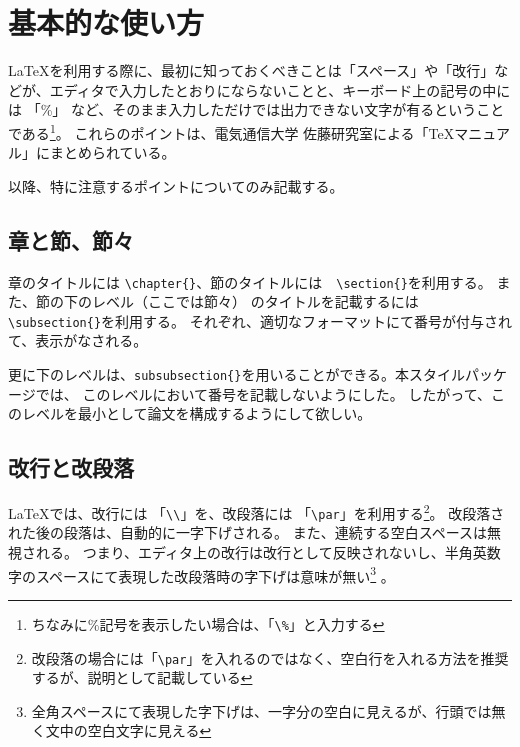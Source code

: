 \section{基本的な使い方}
\LaTeX を利用する際に、最初に知っておくべきことは「スペース」や「改行」などが、エディタで入力したとおりにならないことと、キーボード上の記号の中には 「\%」 など、そのまま入力しただけでは出力できない文字が有るということである\footnote{ちなみに\%記号を表示したい場合は、「\verb+\%+」と入力する}。
これらのポイントは、電気通信大学 佐藤研究室による「TeXマニュアル」\cite{HTUlatex}にまとめられている。

以降、特に注意するポイントについてのみ記載する。
\subsection{章と節、節々}
章のタイトルには \verb+\chapter{}+、節のタイトルには　\verb+\section{}+を利用する。
また、節の下のレベル（ここでは節々） のタイトルを記載するには \verb+\subsection{}+を利用する。
それぞれ、適切なフォーマットにて番号が付与されて、表示がなされる。

更に下のレベルは、\verb+subsubsection{}+を用いることができる。本スタイルパッケージでは、
このレベルにおいて番号を記載しないようにした。
したがって、このレベルを最小として論文を構成するようにして欲しい。

\subsection{改行と改段落}
\LaTeX では、改行には 「\verb+\\+」を、改段落には 「\verb+\par+」を利用する\footnote{改段落の場合には「\verb+\par+」を入れるのではなく、空白行を入れる方法を推奨するが、説明として記載している}。
改段落された後の段落は、自動的に一字下げされる。
また、連続する空白スペースは無視される。
つまり、エディタ上の改行は改行として反映されないし、半角英数字のスペースにて表現した改段落時の字下げは意味が無い\footnote{全角スペースにて表現した字下げは、一字分の空白に見えるが、行頭では無く文中の空白文字に見える}
。

